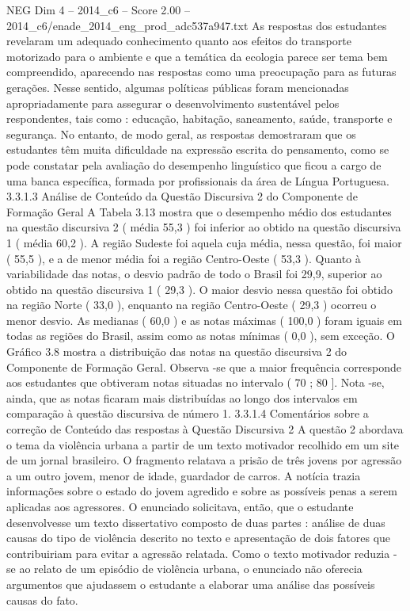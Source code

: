 \begin{textsample}{NEG Dim 4 – 2014\_c6 – Score 2.00 – 2014\_c6/enade\_2014\_eng\_prod\_adc537a947.txt}
As respostas dos estudantes revelaram um adequado conhecimento quanto aos efeitos do transporte motorizado para o ambiente e que a temática da ecologia parece ser tema bem compreendido, aparecendo nas respostas como uma preocupação para as futuras gerações.
Nesse sentido, algumas políticas públicas foram mencionadas apropriadamente para assegurar o desenvolvimento sustentável pelos respondentes, tais como : educação, habitação, saneamento, saúde, transporte e segurança.
No entanto, de modo geral, as respostas demostraram que os estudantes têm muita dificuldade na expressão escrita do pensamento, como se pode constatar pela avaliação do desempenho linguístico que ficou a cargo de uma banca específica, formada por profissionais da área de Língua Portuguesa. 3.3.1.3 Análise de Conteúdo da Questão Discursiva 2 do Componente de Formação Geral A Tabela 3.13 mostra que o desempenho médio dos estudantes na questão discursiva 2 ( média 55,3 ) foi inferior ao obtido na questão discursiva 1 ( média 60,2 ).
A região Sudeste foi aquela cuja média, nessa questão, foi maior ( 55,5 ), e a de menor média foi a região Centro-Oeste ( 53,3 ).
Quanto à variabilidade das notas, o desvio padrão de todo o Brasil foi 29,9, superior ao obtido na questão discursiva 1 ( 29,3 ).
O maior desvio nessa questão foi obtido na região Norte ( 33,0 ), enquanto na região Centro-Oeste ( 29,3 ) ocorreu o menor desvio.
As medianas ( 60,0 ) e as notas máximas ( 100,0 ) foram iguais em todas as regiões do Brasil, assim como as notas mínimas ( 0,0 ), sem exceção.
O Gráfico 3.8 mostra a distribuição das notas na questão discursiva 2 do Componente de Formação Geral.
Observa -se que a maior frequência corresponde aos estudantes que obtiveram notas situadas no intervalo ( 70 ; 80 ].
Nota -se, ainda, que as notas ficaram mais distribuídas ao longo dos intervalos em comparação à questão discursiva de número 1. 3.3.1.4 Comentários sobre a correção de Conteúdo das respostas à Questão Discursiva 2 A questão 2 abordava o tema da violência urbana a partir de um texto motivador recolhido em um site de um jornal brasileiro.
O fragmento relatava a prisão de três jovens por agressão a um outro jovem, menor de idade, guardador de carros.
A notícia trazia informações sobre o estado do jovem agredido e sobre as possíveis penas a serem aplicadas aos agressores.
O enunciado solicitava, então, que o estudante desenvolvesse um texto dissertativo composto de duas partes : análise de duas causas do tipo de violência descrito no texto e apresentação de dois fatores que contribuiriam para evitar a agressão relatada.
Como o texto motivador reduzia -se ao relato de um episódio de violência urbana, o enunciado não oferecia argumentos que ajudassem o estudante a elaborar uma análise das possíveis causas do fato.

\end{textsample}
